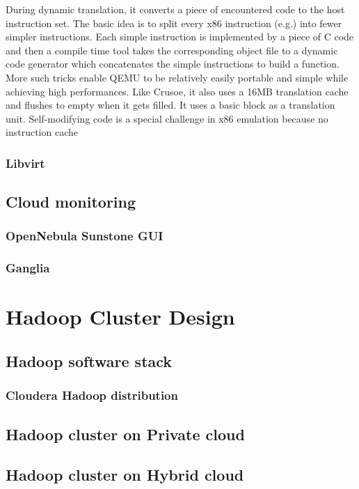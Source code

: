 \documentclass[12pt,a4paper]{report}
\begin{document}
During dynamic translation, it converts a piece of encountered code to the host instruction set. The
basic idea is to split every x86 instruction (e.g.) into fewer simpler instructions. Each simple instruction
is implemented by a piece of C code and then a compile time tool takes the corresponding object ﬁle to a
dynamic code generator which concatenates the simple instructions to build a function. More such tricks
enable QEMU to be relatively easily portable and simple while achieving high performances. Like Crusoe,
it also uses a 16MB translation cache and ﬂushes to empty when it gets ﬁlled. It uses a basic block as a
translation unit. Self-modifying code is a special challenge in x86 emulation because no instruction cache

\subsection{Libvirt}

\section{Cloud monitoring}
\subsection{OpenNebula Sunstone GUI}
\subsection{Ganglia}

\chapter{Hadoop Cluster Design}

\section{Hadoop software stack}
\subsection{Cloudera Hadoop distribution}
\section{Hadoop cluster on Private cloud}
\section{Hadoop cluster on Hybrid cloud}
\end{document}
